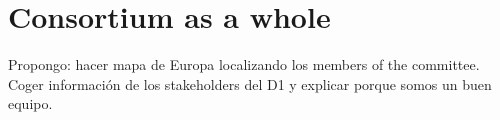\section{Consortium as a whole}

Propongo: hacer mapa de Europa localizando los members of the committee. Coger información de los stakeholders del D1 y explicar porque somos un buen equipo. 
